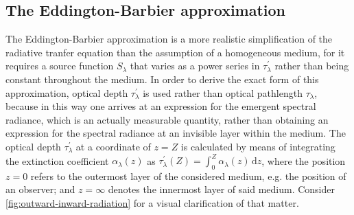 \documentclass[a4paper,11pt]{report}
\begin{document}
\subsection{The Eddington-Barbier approximation}
The Eddington-Barbier approximation is a more realistic simplification of the radiative tranfer equation than the assumption of a homogeneous medium, for it requires a source function $S_\lambda$ that varies as a power series in $\tau_\lambda^\prime$ rather than being constant throughout the medium. In order to derive the exact form of this approximation, optical depth $\tau_\lambda^\prime$ is used rather than optical pathlength $\tau_\lambda$, because in this way one arrives at an expression for the emergent spectral radiance, which is an actually measurable quantity, rather than obtaining an expression for the spectral radiance at an invisible layer within the medium. The optical depth $\tau_\lambda^\prime$ at a coordinate of $z=Z$ is calculated by means of integrating the extinction coefficient $\alpha_\lambda(z)$ as $
\tau_\lambda^\prime(Z) = \int_{0}^{Z} \alpha_\lambda(z)\,\mathrm{d}z$, where the position $z=0$ refers to the outermost layer of the considered medium, e.g. the position of an observer; and $z=\infty$ denotes the innermost layer of said medium. Consider \cref{fig:outward-inward-radiation} for a visual clarification of that matter.
\end{document}
